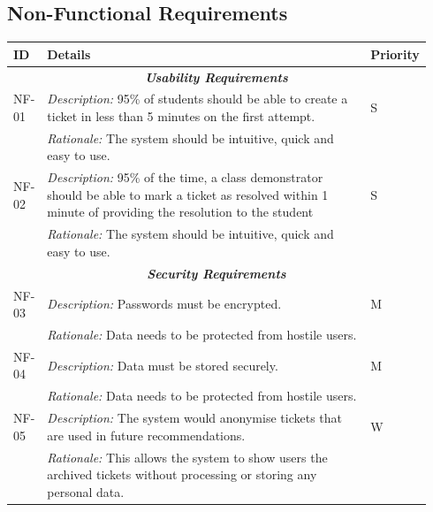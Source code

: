 \subsection{Non-Functional Requirements}

\begin{table}[H]
\small
\begin{tabular}{|p{0.07\linewidth} | p{0.78\linewidth} |p{0.09\linewidth}|}
 \hline
 \textbf{ID} & \textbf{Details} & \textbf{Priority} \\
 
 \hline
   \multicolumn{3}{c}{\textit{\textbf{Usability Requirements}}}\\
 \hline
 
   NF-01 & \textit{Description:} 95\% of students should be able to create a ticket in less than 5 minutes on the first attempt. & S \\
  \cline{2-2}
  & \textit{Rationale:} The system should be intuitive, quick and easy to use. & \\

   \hline\hline
      NF-02 & \textit{Description:} 95\% of the time, a class demonstrator should be able to mark a ticket as resolved within 1 minute of providing the resolution to the student & S \\
  \cline{2-2}
  & \textit{Rationale:} The system should be intuitive, quick and easy to use. & \\
   \hline
     
     \multicolumn{3}{c}{\textit{\textbf{Security Requirements}}}\\
     
     \hline
 NF-03 & \textit{Description:} Passwords must be encrypted. & M\\
  \cline{2-2}
  & \textit{Rationale:} Data needs to be protected from hostile users. & \\
  
    \hline\hline
 NF-04 & \textit{Description:} Data must be stored securely. & M\\
  \cline{2-2}
  & \textit{Rationale:} Data needs to be protected from hostile users. & \\
  
      \hline\hline
 NF-05 & \textit{Description:} The system would anonymise tickets that are used in future recommendations. & W\\
  \cline{2-2}
  & \textit{Rationale:} This allows the system to show users the archived tickets without processing or storing any personal data. & \\
  

\end{tabular}
\end{table}
